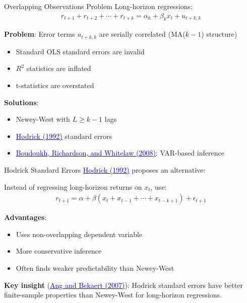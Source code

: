 \documentclass{beamer}
\begin{document}
\begin{frame}{Overlapping Observations Problem}
	Long-horizon regressions:
	\begin{align*}
		r_{t+1} + r_{t+2} + \cdots + r_{t+k} = \alpha_k + \beta_k x_t + u_{t+k,k}
	\end{align*}
	
	\textbf{Problem}: Error terms $u_{t+k,k}$ are serially correlated (MA($k-1$) structure)
	\begin{itemize}
		\item Standard OLS standard errors are \alert{invalid}
		\item $R^2$ statistics are \alert{inflated}
		\item t-statistics are \alert{overstated}
	\end{itemize}
	
	\vspace{5pt}
	\textbf{Solutions}:
	\begin{itemize}
		\item Newey-West with $L \geq k-1$ lags
		\item \href{https://doi.org/10.1093/rfs/5.3.357}{\textcolor{blue}{Hodrick (1992)}} standard errors
		\item \href{https://doi.org/10.1093/rfs/hhl042}{\textcolor{blue}{Boudoukh, Richardson, and Whitelaw (2008)}}: VAR-based inference
	\end{itemize}
\end{frame}

\begin{frame}{Hodrick Standard Errors}
	\href{https://doi.org/10.1093/rfs/5.3.357}{\textcolor{blue}{Hodrick (1992)}} proposes an alternative:
	
	\vspace{5pt}
	Instead of regressing long-horizon returns on $x_t$, use:
	\begin{align*}
		r_{t+1} = \alpha + \beta (x_t + x_{t-1} + \cdots + x_{t-k+1}) + \epsilon_{t+1}
	\end{align*}
	
	\textbf{Advantages}:
	\begin{itemize}
		\item Uses non-overlapping dependent variable
		\item More conservative inference
		\item Often finds weaker predictability than Newey-West
	\end{itemize}
	
	\vspace{5pt}
	\textbf{Key insight} (\href{https://doi.org/10.1093/rfs/hhl021}{\textcolor{blue}{Ang and Bekaert (2007)}}): Hodrick standard errors have better finite-sample properties than Newey-West for long-horizon regressions.
\end{frame}
\end{document}
